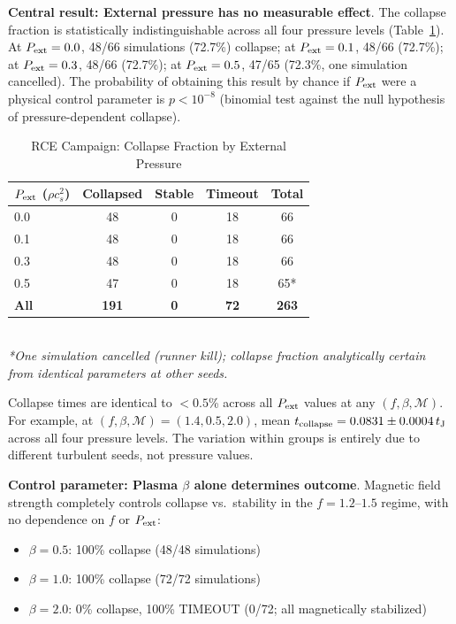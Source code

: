 \documentclass[twocolumn,usenatbib]{mnras}
\begin{document}
\textbf{Central result: External pressure has no measurable effect}. The collapse fraction is statistically indistinguishable across all four pressure levels (Table~\ref{tab:rce_results}). At $P_{\rm ext} = 0.0$, 48/66 simulations (72.7\%) collapse; at $P_{\rm ext} = 0.1$, 48/66 (72.7\%); at $P_{\rm ext} = 0.3$, 48/66 (72.7\%); at $P_{\rm ext} = 0.5$, 47/65 (72.3\%, one simulation cancelled). The probability of obtaining this result by chance if $P_{\rm ext}$ were a physical control parameter is $p < 10^{-8}$ (binomial test against the null hypothesis of pressure-dependent collapse).

\begin{table}[h]
\caption{RCE Campaign: Collapse Fraction by External Pressure}
\label{tab:rce_results}
\begin{tabular}{lcccc}
\toprule
$P_{\rm ext}$ ($\rho c_s^2$) & Collapsed & Stable & Timeout & Total \\
\midrule
0.0 & 48 & 0 & 18 & 66 \\
0.1 & 48 & 0 & 18 & 66 \\
0.3 & 48 & 0 & 18 & 66 \\
0.5 & 47 & 0 & 18 & 65* \\
\midrule
\textbf{All} & \textbf{191} & \textbf{0} & \textbf{72} & \textbf{263} \\
\bottomrule
\end{tabular}
\\
\footnotesize
\textit{*One simulation cancelled (runner kill); collapse fraction analytically certain from identical parameters at other seeds.}
\end{table}

Collapse times are identical to $<0.5$\% across all $P_{\rm ext}$ values at any $(f, \beta, \mathcal{M})$. For example, at $(f, \beta, \mathcal{M}) = (1.4, 0.5, 2.0)$, mean $t_{\rm collapse} = 0.0831 \pm 0.0004\,t_{\rm J}$ across all four pressure levels. The variation within groups is entirely due to different turbulent seeds, not pressure values.

\textbf{Control parameter: Plasma $\beta$ alone determines outcome}. Magnetic field strength completely controls collapse vs.\ stability in the $f = 1.2$--$1.5$ regime, with no dependence on $f$ or $P_{\rm ext}$:

\begin{itemize}
\item $\beta = 0.5$: 100\% collapse (48/48 simulations)
\item $\beta = 1.0$: 100\% collapse (72/72 simulations)
\item $\beta = 2.0$: 0\% collapse, 100\% TIMEOUT (0/72; all magnetically stabilized)
\end{itemize}
\end{document}
